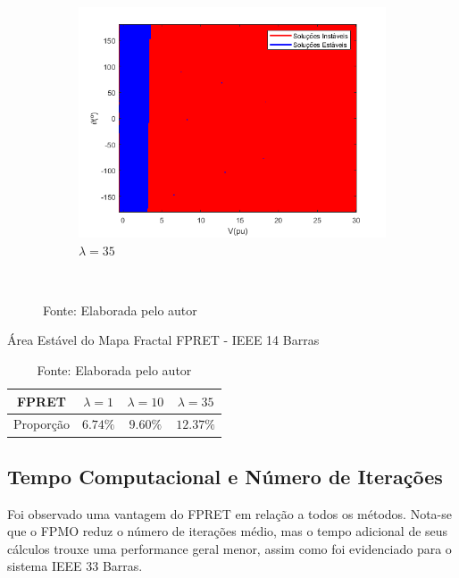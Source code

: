 \begin{figure}[H]
\begin{subfigure}[b]{0.45\textwidth}
        \centering
        \includegraphics[width=\textwidth]{textuais/capitulo4/figuras/fp_ret_20lambda.png}
        \caption{$\lambda=35$}
    \end{subfigure}
        \\
   \caption*{Fonte: Elaborada pelo autor}
   \label{fig:FPRET-14}
\end{figure}

\begin{table}[H]
    \centering
    \caption{Área Estável do Mapa Fractal FPRET - IEEE 14 Barras}
    \begin{tabular}{c c c c}
        \toprule
        FPRET & $\lambda = 1$ & $\lambda = 10$ & $\lambda = 35$ \\
        \midrule
        Proporção & $6.74\%$ & $9.60\%$ & $12.37\%$ \\
        \bottomrule
    \end{tabular}
    \caption*{Fonte: Elaborada pelo autor}
    \label{tabela_fractal_FPRET_14}
\end{table}


\subsection{Tempo Computacional e Número de Iterações}

Foi observado uma vantagem do \ac{FPRET} em relação a todos os métodos. Nota-se que o \ac{FPMO} reduz o número de iterações médio, mas o tempo adicional de seus cálculos trouxe uma performance geral menor, assim como foi evidenciado para o sistema IEEE 33 Barras.


